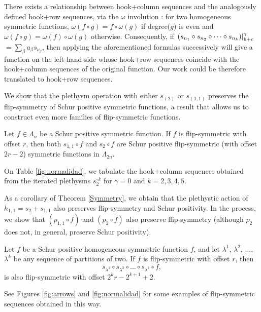 \documentclass[twoside]{article}
\renewcommand{\hc}[1]{\left.\left(#1\right)\right|_{\textnormal{h+c}}}
\begin{document}
\begin{Note}  There exists a relationship between hook+column sequences and the analogously defined hook+row sequences, via the $\omega$ involution \cite{macdonald}: for two homogeneous symmetric functions, $\omega(f\circ g) = f\circ \omega(g)$ if degree($g$) is even and $\omega(f\circ g) = \omega(f)\circ \omega(g)$ otherwise. Consequently, if $\hc{s_{n_1}\circ s_{n_2}\circ\cdots\circ s_{n_k}}^\gamma$ $=\sum_\beta a_\beta s_{\nu_\beta}$, then applying the aforementioned formulas successively will give a function on the left-hand-side whose hook+row sequences coincide with the hook+column sequences of the original function. Our work could be therefore translated to hook+row sequences.
\end{Note}

We show that
the plethysm operation with either $s_{(2)}$ or $s_{(1,1)}$ preserves the flip-symmetry of Schur positive symmetric functions, a result that allows us to construct even more families of flip-symmetric functions.

\begin{thm}\label{Symmetry} Let $f\in\Lambda_n$ be a Schur positive symmetric function.
If $f$ is flip-symmetric with offset $r$, then both $s_{1,1}\circ f$ and $s_2\circ f$ are Schur positive flip-symmetric (with offset $2r-2$) symmetric functions in $\Lambda_{2n}$.
\end{thm}

On Table \ref{fig:normalidad}, we tabulate the hook+column sequences obtained from the iterated plethysms $s_2^{\circ k}$ for $\gamma=0$ and $k=2,3,4,5$.


As a corollary of Theorem \ref{Symmetry}, we obtain that the plethystic action of $h_{1,1} = s_2 + s_{1,1}$ also preserves flip-symmetry and Schur positivity.
In the process, we show that $(p_{1,1}\circ f)$ and $(p_2\circ f)$ also preserve flip-symmetry (although $p_2$ does not, in general, preserve Schur positivity). 

\begin{cor}
Let $f$ be a Schur positive homogeneous symmetric function $f$, and let $\lambda^1$, $\lambda^2$, $\ldots$,
$\lambda^k$
be any sequence of partitions of two. If $f$ is flip-symmetric with offset $r$, then  
\[s_{\lambda^1}\circ s_{\lambda^2}\circ\ldots\circ s_{\lambda^k}\circ f,\]
is also flip-symmetric with offset $2^kr - 2^{k+1}+2$.
\end{cor}
See Figures \ref{fig:arrows} and \ref{fig:normalidad} for some examples of flip-symmetric 
sequences obtained in this way.
\end{document}
